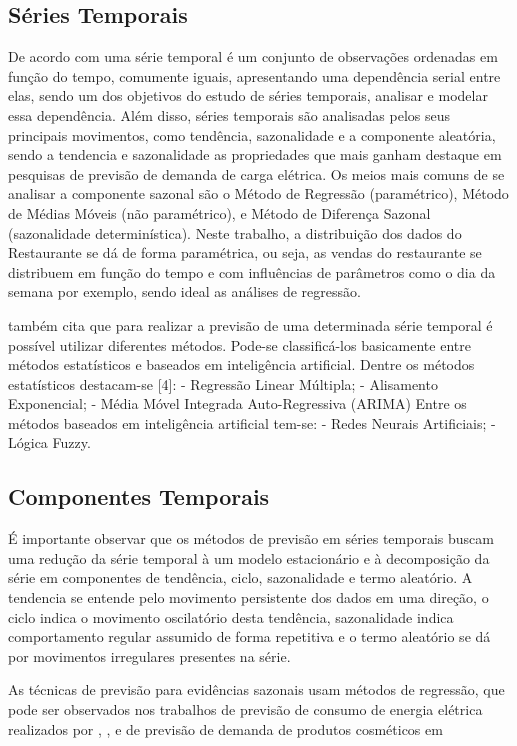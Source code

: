 \documentclass[	12pt, Times, openright, twoside, a4paper, english, brazil]{abntex2}
\begin{document}
\subsection{Séries Temporais}
De acordo com  \cite{Morettin1987} uma série temporal é um conjunto de observações ordenadas em função do tempo, comumente iguais, apresentando uma dependência serial entre elas, sendo um dos objetivos do estudo de séries temporais, analisar e modelar essa dependência. Além disso, séries temporais são analisadas pelos seus principais movimentos, como tendência, sazonalidade e a componente aleatória, sendo a tendencia e sazonalidade as propriedades que mais ganham destaque em pesquisas de previsão de demanda de carga elétrica. Os meios mais comuns de se analisar a componente sazonal são o Método de Regressão (paramétrico), Método de Médias Móveis (não paramétrico), e Método de Diferença Sazonal (sazonalidade determinística).  Neste trabalho, a distribuição dos dados do Restaurante se dá de forma paramétrica, ou seja, as vendas do restaurante se distribuem em função do tempo e com influências de parâmetros como o dia da semana por exemplo, sendo ideal as análises de regressão. 

\cite{Almeida2013} também cita que para realizar a previsão de uma determinada série temporal é possível utilizar diferentes métodos. Pode-se classificá-los basicamente entre métodos estatísticos e baseados em inteligência artificial.
Dentre os métodos estatísticos destacam-se [4]:
- Regressão Linear Múltipla;
- Alisamento Exponencial;
- Média Móvel Integrada Auto-Regressiva (ARIMA)
Entre os métodos baseados em inteligência artificial tem-se:
- Redes Neurais Artificiais;
- Lógica Fuzzy.

\subsection{Componentes Temporais}

É importante observar que os métodos de previsão em séries temporais buscam uma redução da série temporal à um modelo estacionário e à decomposição da série em componentes de tendência, ciclo, sazonalidade e termo aleatório. A tendencia se entende pelo movimento persistente dos dados em uma direção, o ciclo indica o movimento oscilatório desta tendência, sazonalidade indica comportamento regular assumido de forma repetitiva e o termo aleatório se dá por movimentos irregulares presentes na série.
 
As técnicas de previsão para evidências sazonais usam métodos de regressão, que pode ser observados nos trabalhos de previsão de consumo de energia elétrica realizados por \cite{Almeida2013}, \cite{Ruas2012}, \cite{Silva2010} e de previsão de demanda de produtos cosméticos em \cite{Junior2007}
\end{document}
